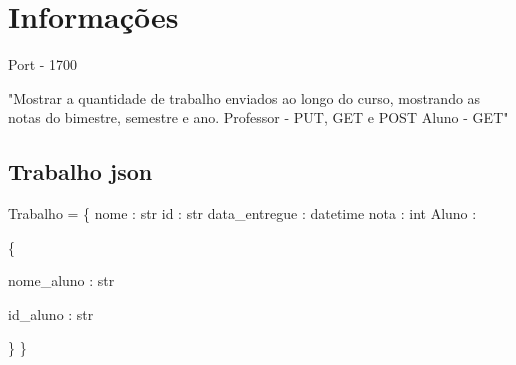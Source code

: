 \documentclass[../main.tex]{subfiles}
\begin{document}
\section{Informações}
Port - 1700 \newline

"Mostrar a quantidade de trabalho enviados ao longo do curso, mostrando as notas do bimestre, semestre e ano. \newline
Professor - PUT, GET e POST \newline
Aluno - GET"

\subsection{Trabalho json}
Trabalho = \newline
\{ \newline
nome : str \newline
id : str \newline
data\_entregue : datetime \newline
nota : int \newline
Aluno : \par 
	\{\par
	nome\_aluno : str \par
	id\_aluno : str \par
\} \newline
\}
\end{document}
